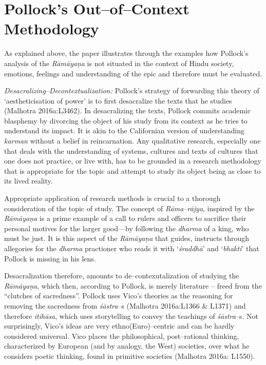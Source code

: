 \section*{Pollock’s Out–of–Context Methodology}

As explained above, the paper illustrates through the examples how Pollock’s analysis of the \textit{Rāmāyaṇa} is not situated in the context of Hindu society, emotions, feelings and understanding of the epic and therefore must be evaluated.

\textit{Desacralizing–Decontextualization:} Pollock’s strategy of forwarding this theory of ‘aestheticisation of power’ is to first desacralize the texts that he studies (Malhotra 2016a:L3462). In desacralizing the texts, Pollock commits academic blasphemy by divorcing the object of his study from its context as he tries to understand its impact. It is akin to the Californian version of understanding \textit{karman} without a belief in reincarnation. Any qualitative research, especially one that deals with the understanding of systems, cultures and texts of cultures that one does not practice, or live with, has to be grounded in a research methodology that is appropriate for the topic and attempt to study its object being as close to its lived reality.

Appropriate application of research methods is crucial to a thorough consideration of the topic of study. The concept of \textit{Rāma–rājya}, inspired by the \textit{Rāmāyaṇa} is a prime example of a call to rulers and officers to sacrifice their personal motives for the larger good—by following the \textit{dharma} of a king, who must be just. It is this aspect of the \textit{Rāmāyaṇa} that guides, instructs through allegories for the \textit{dharma} practioner who reads it with ‘\textit{śraddhā}’ and ‘\textit{bhakti}’ that Pollock is missing in his lens.

Desacralization therefore, amounts to de–contexutalization of studying the \textit{Rāmāyaṇa}, which then, according to Pollock, is merely literature – freed from the “clutches of sacredness”. Pollock uses Vico’s theories as the reasoning for removing the sacredness from \textit{śāstra}–s (Malhotra 2016a:L1366 \& L1371) and therefore \textit{itihāsa}, which uses storytelling to convey the teachings of \textit{śāstra}–s. Not surprisingly, Vico’s ideas are very ethno(Euro)–centric and can be hardly considered universal. Vico places the philosophical, post–rational thinking, characterized by European (and by analogy, the West) societies, over what he considers poetic thinking, found in primitive societies (Malhotra 2016a: L1550).

